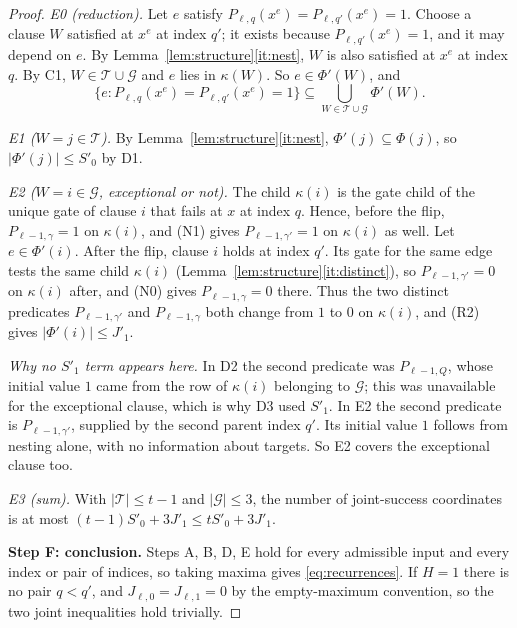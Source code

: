 \documentclass[11pt]{article}
\theoremstyle{definition}
\theoremstyle{remark}
\begin{document}
\begin{proof}
\emph{E0 (reduction).} Let \(e\) satisfy
\(P_{\ell,q}(x^e)=P_{\ell,q'}(x^e)=1\). Choose a clause \(W\) satisfied at
\(x^e\) at index \(q'\); it exists because \(P_{\ell,q'}(x^e)=1\), and it may
depend on \(e\). By Lemma~\ref{lem:structure}\ref{it:nest}, \(W\) is also
satisfied at \(x^e\) at index \(q\). By C1, \(W\in\mathcal T\cup\mathcal G\)
and \(e\) lies in \(\kappa(W)\). So \(e\in\Phi'(W)\), and
\[
 \{e:P_{\ell,q}(x^e)=P_{\ell,q'}(x^e)=1\}\subseteq
 \bigcup_{W\in\mathcal T\cup\mathcal G}\Phi'(W).
\]

\emph{E1 (\(W=j\in\mathcal T\)).} By
Lemma~\ref{lem:structure}\ref{it:nest}, \(\Phi'(j)\subseteq\Phi(j)\), so
\(|\Phi'(j)|\le S'_0\) by D1.

\emph{E2 (\(W=i\in\mathcal G\), exceptional or not).} The child
\(\kappa(i)\) is the gate child of the unique gate of clause \(i\) that
fails at \(x\) at index \(q\). Hence, before the flip, \(P_{\ell-1,\gamma}=1\)
on \(\kappa(i)\), and (N1) gives \(P_{\ell-1,\gamma'}=1\) on \(\kappa(i)\)
as well. Let \(e\in\Phi'(i)\). After the flip, clause \(i\) holds at index
\(q'\). Its gate for the same edge tests the same child \(\kappa(i)\)
(Lemma~\ref{lem:structure}\ref{it:distinct}), so
\(P_{\ell-1,\gamma'}=0\) on \(\kappa(i)\) after, and (N0) gives
\(P_{\ell-1,\gamma}=0\) there. Thus the two distinct predicates
\(P_{\ell-1,\gamma'}\) and \(P_{\ell-1,\gamma}\) both change from \(1\) to
\(0\) on \(\kappa(i)\), and (R2) gives \(|\Phi'(i)|\le J'_1\).

\emph{Why no \(S'_1\) term appears here.} In D2 the second predicate was
\(P_{\ell-1,Q}\), whose initial value \(1\) came from the row of
\(\kappa(i)\) belonging to \(\mathcal G\); this was unavailable for the
exceptional clause, which is why D3 used \(S'_1\). In E2 the second
predicate is \(P_{\ell-1,\gamma'}\), supplied by the second parent index
\(q'\). Its initial value \(1\) follows from nesting alone, with no
information about targets. So E2 covers the exceptional clause too.

\emph{E3 (sum).} With \(|\mathcal T|\le t-1\) and \(|\mathcal G|\le3\), the
number of joint-success coordinates is at most
\((t-1)S'_0+3J'_1\le tS'_0+3J'_1\).

\medskip\noindent\textbf{Step F: conclusion.}
Steps A, B, D, E hold for every admissible input and every index or pair of
indices, so taking maxima gives \eqref{eq:recurrences}. If \(H=1\) there is
no pair \(q<q'\), and \(J_{\ell,0}=J_{\ell,1}=0\) by the empty-maximum
convention, so the two joint inequalities hold trivially.
\end{proof}
\end{document}
